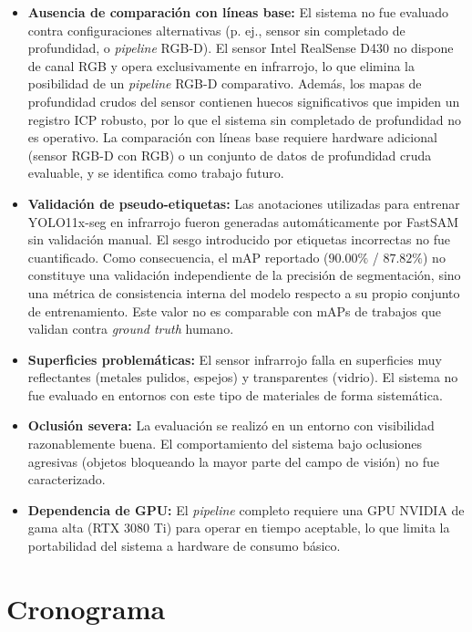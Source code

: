 \documentclass[12pt, a4, twoside, openany]{report}
\begin{document}
\begin{itemize}
    \item \textbf{Ausencia de comparación con líneas base:} El sistema no fue evaluado contra configuraciones alternativas (p. ej., sensor sin completado de profundidad, o \textit{pipeline} RGB-D). El sensor Intel RealSense D430 no dispone de canal RGB y opera exclusivamente en infrarrojo, lo que elimina la posibilidad de un \textit{pipeline} RGB-D comparativo. Además, los mapas de profundidad crudos del sensor contienen huecos significativos que impiden un registro ICP robusto, por lo que el sistema sin completado de profundidad no es operativo. La comparación con líneas base requiere hardware adicional (sensor RGB-D con RGB) o un conjunto de datos de profundidad cruda evaluable, y se identifica como trabajo futuro.

    \item \textbf{Validación de pseudo-etiquetas:} Las anotaciones utilizadas para entrenar YOLO11x-seg en infrarrojo fueron generadas automáticamente por FastSAM sin validación manual. El sesgo introducido por etiquetas incorrectas no fue cuantificado. Como consecuencia, el mAP reportado ($90.00\%$ / $87.82\%$) no constituye una validación independiente de la precisión de segmentación, sino una métrica de consistencia interna del modelo respecto a su propio conjunto de entrenamiento. Este valor no es comparable con mAPs de trabajos que validan contra \textit{ground truth} humano.

    \item \textbf{Superficies problemáticas:} El sensor infrarrojo falla en superficies muy reflectantes (metales pulidos, espejos) y transparentes (vidrio). El sistema no fue evaluado en entornos con este tipo de materiales de forma sistemática.

    \item \textbf{Oclusión severa:} La evaluación se realizó en un entorno con visibilidad razonablemente buena. El comportamiento del sistema bajo oclusiones agresivas (objetos bloqueando la mayor parte del campo de visión) no fue caracterizado.

    \item \textbf{Dependencia de GPU:} El \textit{pipeline} completo requiere una GPU NVIDIA de gama alta (RTX 3080 Ti) para operar en tiempo aceptable, lo que limita la portabilidad del sistema a hardware de consumo básico.
\end{itemize}

\section{Cronograma}
\end{document}
